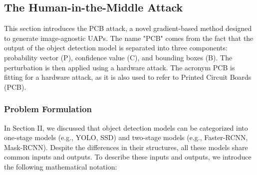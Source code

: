 


\subsection{The Human-in-the-Middle Attack}

This section introduces the PCB attack, a novel gradient-based method designed to generate image-agnostic UAPs. The name "PCB" comes from the fact that the output of the object detection model is separated into three components: probability vector (P), confidence value (C), and bounding boxes (B). The perturbation is then applied using a hardware attack. The acronym PCB is fitting for a hardware attack, as it is also used to refer to Printed Circuit Boards (PCB).

\subsubsection{Problem Formulation} 


In Section II, we discussed that object detection models can be categorized into one-stage models (e.g., YOLO, SSD) and two-stage models (e.g., Faster-RCNN, Mask-RCNN). Despite the differences in their structures, all these models share common inputs and outputs. To describe these inputs and outputs, we introduce the following mathematical notation:

